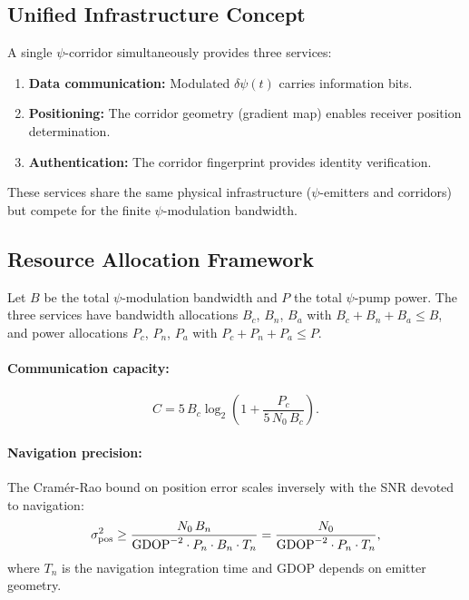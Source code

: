\documentclass[twocolumn,superscriptaddress,prd,nofootinbib]{revtex4-2}
\begin{document}
\subsection{Unified Infrastructure Concept}

A single $\psi$-corridor simultaneously provides three services:
\begin{enumerate}
\item \textbf{Data communication:} Modulated $\delta\psi(t)$ carries
information bits.
\item \textbf{Positioning:} The corridor geometry (gradient map) enables
receiver position determination.
\item \textbf{Authentication:} The corridor fingerprint provides identity
verification.
\end{enumerate}
These services share the same physical infrastructure ($\psi$-emitters
and corridors) but compete for the finite $\psi$-modulation bandwidth.

\subsection{Resource Allocation Framework}

Let $B$ be the total $\psi$-modulation bandwidth and $P$ the total
$\psi$-pump power. The three services have bandwidth allocations
$B_c$, $B_n$, $B_a$ with $B_c + B_n + B_a \leq B$, and power
allocations $P_c$, $P_n$, $P_a$ with $P_c + P_n + P_a \leq P$.

\paragraph{Communication capacity:}
\begin{equation}
C = 5\,B_c\log_2\!\left(1 + \frac{P_c}{5\,N_0\,B_c}\right).
\end{equation}

\paragraph{Navigation precision:}
The Cram\'er-Rao bound on position error scales inversely with
the SNR devoted to navigation:
\begin{equation}
\sigma_{\rm pos}^2 \geq \frac{N_0\,B_n}{\text{GDOP}^{-2}\cdot P_n\cdot B_n\cdot T_n}
= \frac{N_0}{\text{GDOP}^{-2}\cdot P_n \cdot T_n},
\end{equation}
where $T_n$ is the navigation integration time and GDOP depends on
emitter geometry.
\end{document}
